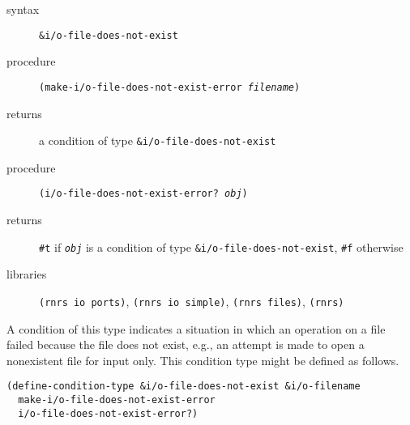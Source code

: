\begin{description}

\label{exceptions_s40}\item[syntax] \texttt{\&{}i/o-file-does-not-exist}



\item[procedure] \texttt{(make-i/o-file-does-not-exist-error \textit{filename})}



\item[returns] a condition of type \texttt{\&{}i/o-file-does-not-exist}


\item[procedure] \texttt{(i/o-file-does-not-exist-error? \textit{obj})}



\item[returns] \texttt{\#{}t} if \texttt{\textit{obj}} is a condition of type \texttt{\&{}i/o-file-does-not-exist}, \texttt{\#{}f} otherwise


\item[libraries] \texttt{(rnrs io ports)}, \texttt{(rnrs io simple)}, \texttt{(rnrs files)}, \texttt{(rnrs)}
\end{description}



A condition of this type indicates a situation in which an operation on a file
failed because the file does not exist, e.g., an attempt is made to open a
nonexistent file for input only.
This condition type might be defined as follows.

\begin{alltt}
(define-condition-type \&{}i/o-file-does-not-exist \&{}i/o-filename
  make-i/o-file-does-not-exist-error
  i/o-file-does-not-exist-error?)
\end{alltt}

